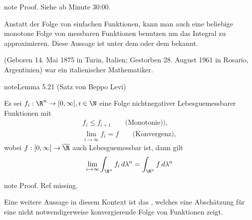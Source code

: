 \documentclass[letterpaper,10pt,german]{jupyterBook}
\begin{document}
\begin{sphinxadmonition}{note}
\sphinxAtStartPar
Proof. Siehe  ab Minute 30:00.
\end{sphinxadmonition}

\sphinxAtStartPar
Anstatt der Folge von einfachen Funktionen, kann man auch eine beliebige monotone Folge von messbaren Funktionen benutzen um das Integral zu approximieren. Diese Aussage ist unter dem  oder dem  bekannt.

\begin{sphinxShadowBox}

\sphinxAtStartPar
{} (Geboren 14. Mai 1875 in Turin, Italien; Gestorben 28. August 1961 in Rosario, Argentinien) war ein italienischer Mathematiker.
\end{sphinxShadowBox}
\label{masstheorie/lebesgue_integral:lem:levi}
\begin{sphinxadmonition}{note}{Lemma 5.21 (Satz von Beppo Levi)}



\sphinxAtStartPar
Es sei \(f_i:\R^n\to[0,\infty],i\in\N\) eine Folge nicht\sphinxhyphen{}negativer Lebesgue\sphinxhyphen{}messbarer Funktionen mit
\begin{equation*}
\begin{split}f_i\leq f_{i+1}\qquad\text{(Monotonie))},\\
\lim_{i\to\infty} f_i = f\qquad\text{(Konvergenz)},\end{split}
\end{equation*}
\sphinxAtStartPar
wobei \(f:[0,\infty]\to\overline{\R}\) auch Lebesgue\sphinxhyphen{}messbar ist, dann gilt
\begin{equation*}
\begin{split}\lim_{i\to\infty} \int_{\R^n} f_i \,d\lambda^n = \int_{\R^n} f \,d\lambda^n\end{split}
\end{equation*}\end{sphinxadmonition}

\begin{sphinxadmonition}{note}
\sphinxAtStartPar
Proof. Ref missing.
\end{sphinxadmonition}

\sphinxAtStartPar
Eine weitere Aussage in diesem Kontext ist das , welches eine Abschätzung für eine nicht notwendigerweise konvergierende Folge von Funktionen zeigt.
\end{document}
